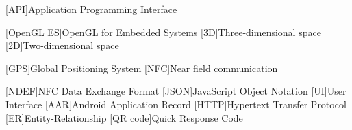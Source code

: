[API]{Application Programming Interface}

[OpenGL ES]{OpenGL for Embedded Systems}
[3D]{Three-dimensional space}
[2D]{Two-dimensional space}

[GPS]{Global Positioning System}
[NFC]{Near field communication}

[NDEF]{NFC Data Exchange Format}
[JSON]{JavaScript Object Notation}
[UI]{User Interface}
[AAR]{Android Application Record}
[HTTP]{Hypertext Transfer Protocol}
[ER]{Entity-Relationship}
[QR code]{Quick Response Code}